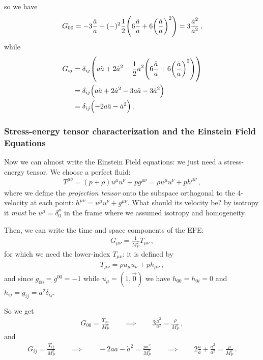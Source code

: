 \documentclass[main.tex]{subfiles}
\begin{document}
%
so we have 
%
\begin{align}
G_{00} = - 3 \frac{\ddot{a}}{a} + (-)^2 \frac{1}{2}  \qty(6 \frac{\ddot{a}}{a} + 6 \qty(\frac{\dot{a}}{a})^2)
= 3 \frac{\dot{a}^2}{a^2}
\,,
\end{align}
%
while 
%
\begin{subequations}
\begin{align}
G_{ij} &= \delta_{ij} \qty( a \ddot{a} +2 \dot{a}^2
- \frac{1}{2} a^2 \qty(6 \frac{\ddot{a}}{a} + 6 \qty(\frac{\dot{a}}{a})^2))  \\
&= \delta_{ij} \qty(a \ddot{a} + 2 \dot{a}^2 - 3 a \ddot{a} - 3 \dot{a}^2) \\
&= \delta_{ij} \qty(-2 a \ddot{a} - \dot{a}^2)
\,.
\end{align}
\end{subequations}
%

\subsubsection{Stress-energy tensor characterization and the Einstein Field Equations}

Now we can almost write the Einstein Field equations: we just need a stress-energy tensor. We choose a perfect fluid: 
%
\begin{align}
T^{\mu \nu } = (p + \rho ) u^{\mu } u^{\nu } + p g^{\mu \nu } = \rho u^{\mu } u^{\nu } + p h^{\mu \nu }
\,,
\end{align}
%
where we define the \emph{projection tensor} onto the subspace orthogonal to the 4-velocity at each point: \(h^{\mu \nu } = u^{\mu } u^{\nu } + g^{\mu \nu }\). 
What should its velocity be? 
by isotropy it \emph{must} be \(u^{\mu } = \delta^{\mu }_{0}\) in the frame where we assumed isotropy and homogeneity.

Then, we can write the time and space components of the EFE: 
%
\begin{align}
G_{\mu \nu } = \frac{1}{M_P^2} T_{\mu \nu }
\,,
\end{align}
%
for which we need the lower-index \(T_{\mu \nu }\): it is defined by 
%
\begin{align}
T_{\mu \nu } = \rho u_{\mu} u_{\nu } + p h_{\mu \nu }
\,,
\end{align}
%
and since \(g_{00} = g^{00 } = -1\) while \(u_{\mu } = (1, \vec{0})\) we have \(h_{00} = h_{0i} =  0\) and \(h_{ij} = g_{ij} =  a^2 \delta_{ij}\).

So we get 
%
\begin{align}
G_{00} = \frac{T_{00} }{M_P^2}
\qquad \implies \qquad
3 \frac{\dot{a}^2}{a^2} = \frac{\rho}{M_P^2}
\,,
\end{align}
%
and 
%
\begin{align}
G_{ij} = \frac{T_{ij}}{M_P^2}
\qquad \implies \qquad
-2 a \ddot{a} - \dot{a}^2 = \frac{p a^2}{M_P^2}
\qquad \implies \qquad
2 \frac{\ddot{a}}{a} + \frac{\dot{a}^2}{a^2} = \frac{p}{M_P^2}
\,.
\end{align}
\end{document}
